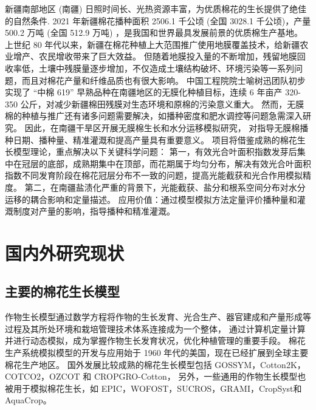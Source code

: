 新疆南部地区 (南疆) 日照时间长、光热资源丰富，为优质棉花的生长提供了绝佳的自然条件.
2021 年新疆棉花播种面积 2506.1 千公顷 (全国 3028.1 千公顷)，产量 500.2 万吨 (全国 512.9 万吨) \cite{国家统计局关于2021年棉花产量的公告}，是我国和世界最具发展前景的优质棉生产基地。
上世纪 80 年代以来，新疆在棉花种植上大范围推广使用地膜覆盖技术，给新疆农业增产、农民增收带来了巨大效益。
但随着地膜投入量的不断增加，残留地膜回收率低，土壤中残膜量逐步增加，不仅造成土壤结构破坏、环境污染等一系列问题，而且对棉花产量和纤维品质也有很大影响。
中国工程院院士喻树迅团队初步实现了 “中棉 619” 早熟品种在南疆地区的无膜化种植目标，连续 6 年亩产 320{-}350 公斤，对减少新疆棉田残膜对生态环境和原棉的污染意义重大\cite{yu2019}。
然而，无膜棉的种植与推广还有诸多问题需要解决，如播种密度和肥水调控等问题急需深入研究。
因此，在南疆干旱区开展无膜棉生长和水分运移模拟研究，
对指导无膜棉播种日期、播种量、精准灌溉和提高产量具有重要意义。
项目将借鉴成熟的棉花生长模型理论，重点解决以下关键科学问题：
第一，有效光合叶面积指数发芽后集中在冠层的底部，成熟期集中在顶部，而花期属于均匀分布，解决有效光合叶面积指数不同发育阶段在棉花冠层分布不一致的问题，提高光能截获和光合作用模拟精度。
第二，在南疆盐渍化严重的背景下，光能截获、盐分和根系空间分布对水分运移的耦合影响和定量描述。
应用价值：通过模型模拟方法定量评价播种量和灌溉制度对产量的影响，指导播种和精准灌溉。
\section{国内外研究现状}
\subsection{主要的棉花生长模型}
作物生长模型通过数学方程将作物的生长发育、光合生产、器官建成和产量形成等过程及其所处环境和栽培管理技术体系连接成为一个整体，
通过计算机定量计算并进行动态模拟，成为掌握作物生长发育状况，优化种植管理的重要手段。
棉花生产系统模拟模型的开发与应用始于 1960 年代的美国，现在已经扩展到全球主要棉花生产地区。
国外发展比较成熟的棉花生长模型包括 GOSSYM\cite{baker1976}，Cotton2K\cite{cotton2kv4}，COTCO2\cite{wall1994}，OZCOT\cite{hearn1994} 和 CROPGRO-Cotton\cite{jones2003}，
另外，一些通用的作物生长模型也被用于模拟棉花生长，如 EPIC\cite{williams1989}，WOFOST\cite{vanDiepen1989WOFOST}，SUCROS\cite{vanittersum2003}，GRAMI\cite{ko2005}，CropSyst\cite{sommer2008}和 AquaCrop\cite{steduto2009}。

